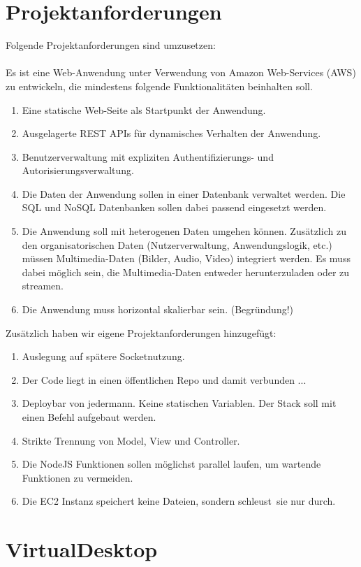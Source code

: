 \documentclass[a4paper, 12pt]{scrreprt}
\renewcommand\_{\textunderscore\allowbreak}
\begin{document}
\section{Projektanforderungen}
Folgende Projektanforderungen sind umzusetzen:
\\ \\
Es ist eine Web-Anwendung unter Verwendung von Amazon Web-Services (AWS) zu
entwickeln, die mindestens folgende Funktionalitäten beinhalten soll.
\begin{enumerate}
\item Eine statische Web-Seite als Startpunkt der Anwendung.
\item Ausgelagerte REST APIs für dynamisches Verhalten der Anwendung.
\item Benutzerverwaltung mit expliziten Authentifizierungs- und Autorisierungsverwaltung.
\item Die Daten der Anwendung sollen in einer Datenbank verwaltet werden. Die SQL und NoSQL Datenbanken sollen dabei passend eingesetzt werden.
\item Die Anwendung soll mit heterogenen Daten umgehen können. Zusätzlich zu den
organisatorischen Daten (Nutzerverwaltung, Anwendungslogik, etc.) müssen
Multimedia-Daten (Bilder, Audio, Video) integriert werden. Es muss dabei möglich
sein, die Multimedia-Daten entweder herunterzuladen oder zu streamen.
\item Die Anwendung muss horizontal skalierbar sein. (Begründung!)
\end{enumerate}
Zusätzlich haben wir eigene Projektanforderungen hinzugefügt:
\begin{enumerate}
\item Auslegung auf spätere Socketnutzung.
\item Der Code liegt in einen öffentlichen Repo und damit verbunden ...
\item Deploybar von jedermann. Keine statischen Variablen. Der Stack soll mit einen Befehl aufgebaut werden.
\item Strikte Trennung von Model, View und Controller. 
\item Die NodeJS Funktionen sollen möglichst parallel laufen, um wartende Funktionen zu vermeiden.
\item Die EC2 Instanz speichert keine Dateien, sondern \dq schleust\dq\ sie nur durch.
\end{enumerate}

\section{VirtualDesktop}
\end{document}
